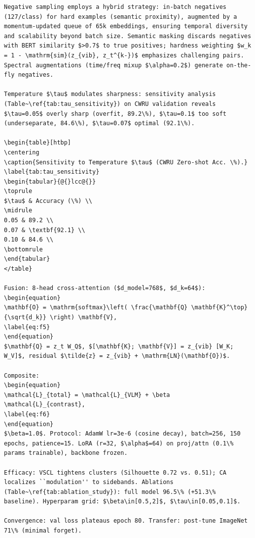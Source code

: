 \begin{verbatim}
Negative sampling employs a hybrid strategy: in-batch negatives (127/class) for hard examples (semantic proximity), augmented by a momentum-updated queue of 65k embeddings, ensuring temporal diversity and scalability beyond batch size. Semantic masking discards negatives with BERT similarity $>0.7$ to true positives; hardness weighting $w_k = 1 - \mathrm{sim}(z_{vib}, z_t^{k-})$ emphasizes challenging pairs. Spectral augmentations (time/freq mixup $\alpha=0.2$) generate on-the-fly negatives.

Temperature $\tau$ modulates sharpness: sensitivity analysis (Table~\ref{tab:tau_sensitivity}) on CWRU validation reveals $\tau=0.05$ overly sharp (overfit, 89.2\%), $\tau=0.1$ too soft (underseparate, 84.6\%), $\tau=0.07$ optimal (92.1\%). 

\begin{table}[htbp]
\centering
\caption{Sensitivity to Temperature $\tau$ (CWRU Zero-shot Acc. \%).}
\label{tab:tau_sensitivity}
\begin{tabular}{@{}lcc@{}}
\toprule
$\tau$ & Accuracy (\%) \\
\midrule
0.05 & 89.2 \\
0.07 & \textbf{92.1} \\
0.10 & 84.6 \\
\bottomrule
\end{tabular}
</table}

Fusion: 8-head cross-attention ($d_model=768$, $d_k=64$):
\begin{equation}
\mathbf{O} = \mathrm{softmax}\left( \frac{\mathbf{Q} \mathbf{K}^\top}{\sqrt{d_k}} \right) \mathbf{V},
\label{eq:f5}
\end{equation}
$\mathbf{Q} = z_t W_Q$, $[\mathbf{K}; \mathbf{V}] = z_{vib} [W_K; W_V]$, residual $\tilde{z} = z_{vib} + \mathrm{LN}(\mathbf{O})$.

Composite:
\begin{equation}
\mathcal{L}_{total} = \mathcal{L}_{VLM} + \beta \mathcal{L}_{contrast},
\label{eq:f6}
\end{equation}
$\beta=1.0$. Protocol: AdamW lr=3e-6 (cosine decay), batch=256, 150 epochs, patience=15. LoRA (r=32, $\alpha$=64) on proj/attn (0.1\% params trainable), backbone frozen.

Efficacy: VSCL tightens clusters (Silhouette 0.72 vs. 0.51); CA localizes ``modulation'' to sidebands. Ablations (Table~\ref{tab:ablation_study}): full model 96.5\% (+51.3\% baseline). Hyperparam grid: $\beta\in[0.5,2]$, $\tau\in[0.05,0.1]$.

Convergence: val loss plateaus epoch 80. Transfer: post-tune ImageNet 71\% (minimal forget).


\end{verbatim}
